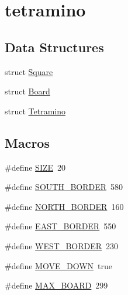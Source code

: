 \hypertarget{group__tetramino}{}\section{tetramino}
\label{group__tetramino}
\subsection*{Data Structures}
\begin{DoxyCompactItemize}
\item 
struct \mbox{\hyperlink{struct_square}{Square}}
\item 
struct \mbox{\hyperlink{struct_board}{Board}}
\item 
struct \mbox{\hyperlink{struct_tetramino}{Tetramino}}
\end{DoxyCompactItemize}
\subsection*{Macros}
\begin{DoxyCompactItemize}
\item 
\#define \mbox{\hyperlink{group__tetramino_ga70ed59adcb4159ac551058053e649640}{S\+I\+ZE}}~20
\item 
\#define \mbox{\hyperlink{group__tetramino_gaf53d889f840b107b1a7ffd5534d8a484}{S\+O\+U\+T\+H\+\_\+\+B\+O\+R\+D\+ER}}~580
\item 
\#define \mbox{\hyperlink{group__tetramino_ga3aca436a21c820e0632d5d815a520189}{N\+O\+R\+T\+H\+\_\+\+B\+O\+R\+D\+ER}}~160
\item 
\#define \mbox{\hyperlink{group__tetramino_gaec71d31827b6eb16515454097e75cf12}{E\+A\+S\+T\+\_\+\+B\+O\+R\+D\+ER}}~550
\item 
\#define \mbox{\hyperlink{group__tetramino_gae6a8f15a920bce5c0cbcf2577915268e}{W\+E\+S\+T\+\_\+\+B\+O\+R\+D\+ER}}~230
\item 
\#define \mbox{\hyperlink{group__tetramino_gab6ccafbecf8edd9189e074574b652c91}{M\+O\+V\+E\+\_\+\+D\+O\+WN}}~true
\item 
\#define \mbox{\hyperlink{group__tetramino_gac6d51f1ce7e6114465d635e6b8411d2c}{M\+A\+X\+\_\+\+B\+O\+A\+RD}}~299
\end{DoxyCompactItemize}
